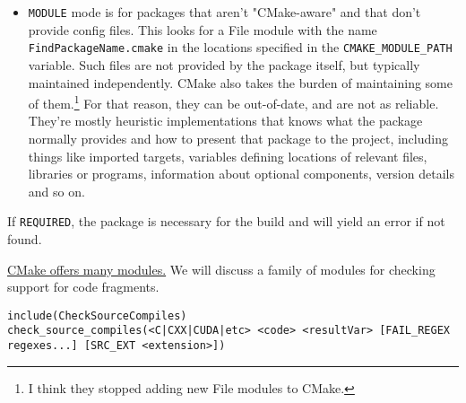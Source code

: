 \documentclass[8pt, table, xcdraw]{article}%
\begin{document}
\begin{itemize}
\begin{itemize}
    \item \lstinline{MODULE} mode is for packages that aren't "CMake-aware" and that don't provide config files. This looks for a File module with the name \lstinline{FindPackageName.cmake} in the locations specified in the \lstinline{CMAKE_MODULE_PATH} variable. Such files are not provided by the package itself, but typically maintained independently. CMake also takes the burden of maintaining some of them.\footnote{I think they stopped adding new File modules to CMake.} For that reason, they can be out-of-date, and are not as reliable. They're mostly heuristic implementations that knows what the package normally provides and how to present that package to the project, including things like imported targets, variables defining locations of relevant files, libraries or programs, information about optional components, version details and so on.
\end{itemize}

If \lstinline{REQUIRED}, the package is necessary for the build and will yield an error if not found.
\end{itemize}

\href{https://cmake.org/cmake/help/latest/manual/cmake-modules.7.html}{CMake offers many modules.} We will discuss a family of modules for checking support for code fragments.

\begin{lstlisting}
include(CheckSourceCompiles)
check_source_compiles(<C|CXX|CUDA|etc> <code> <resultVar> [FAIL_REGEX regexes...] [SRC_EXT <extension>])
\end{lstlisting}
\end{document}
